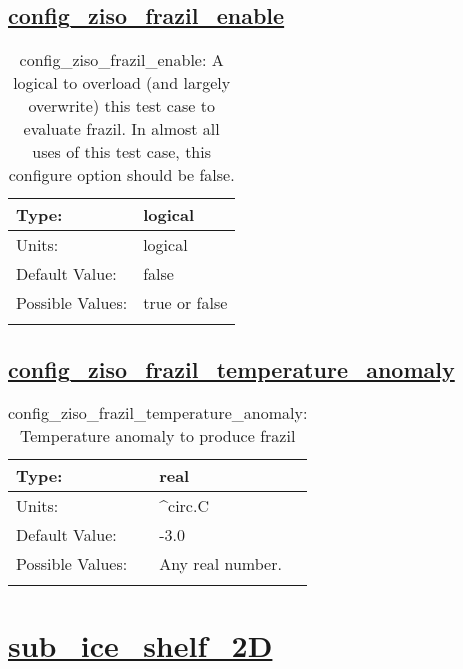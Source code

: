 \subsection[config\_ziso\_frazil\_enable]{\hyperref[sec:nm_tab_ziso]{config\_ziso\_frazil\_enable}}
\label{subsec:nm_sec_config_ziso_frazil_enable}
\begin{center}
\begin{longtable}{| p{2.0in} || p{4.0in} |}
    \hline
    Type: & logical \\
    \hline
    Units: & \si{logical} \\
    \hline
    Default Value: & false \\
    \hline
    Possible Values: & true or false \\
    \hline
    \caption{config\_ziso\_frazil\_enable: A logical to overload (and largely overwrite) this test case to evaluate frazil. In almost all uses of this test case, this configure option should be false.}
\end{longtable}
\end{center}
\subsection[config\_ziso\_frazil\_temperature\_anomaly]{\hyperref[sec:nm_tab_ziso]{config\_ziso\_frazil\_temperature\_anomaly}}
\label{subsec:nm_sec_config_ziso_frazil_temperature_anomaly}
\begin{center}
\begin{longtable}{| p{2.0in} || p{4.0in} |}
    \hline
    Type: & real \\
    \hline
    Units: & \si{^{circ}.C} \\
    \hline
    Default Value: & -3.0 \\
    \hline
    Possible Values: & Any real number. \\
    \hline
    \caption{config\_ziso\_frazil\_temperature\_anomaly: Temperature anomaly to produce frazil}
\end{longtable}
\end{center}
\section[sub\_ice\_shelf\_2D]{\hyperref[sec:nm_tab_sub_ice_shelf_2D]{sub\_ice\_shelf\_2D}}
\label{sec:nm_sec_sub_ice_shelf_2D}
